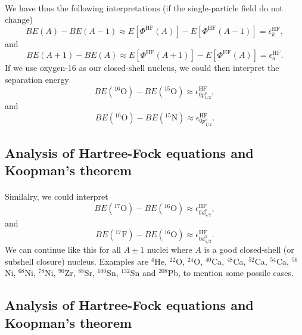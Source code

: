 \documentclass[%
twoside,                 %
final,                   %
10pt]{article}
\begin{document}
\paragraph{}
We have thus the following interpretations (if the single-particle field do not change)
\[
BE(A)-BE(A-1)\approx  E[\Phi^{\mathrm{HF}}(A)]-   E[\Phi^{\mathrm{HF}}(A-1)] 
  = \epsilon_k^{\mathrm{HF}}, 
\]
and
\[
BE(A+1)-BE(A)\approx  E[\Phi^{\mathrm{HF}}(A+1)]-   E[\Phi^{\mathrm{HF}}(A)] =  \epsilon_a^{\mathrm{HF}}. 
\]
If  we use oxygen-16 as our closed-shell nucleus, we could then interpret the separation energy
\[
BE(^{16}\mathrm{O})-BE(^{15}\mathrm{O})\approx \epsilon_{0p^{\nu}_{1/2}}^{\mathrm{HF}}, 
\]
and
\[
BE(^{16}\mathrm{O})-BE(^{15}\mathrm{N})\approx \epsilon_{0p^{\pi}_{1/2}}^{\mathrm{HF}}.
\]



\subsection*{Analysis of Hartree-Fock equations and Koopman's theorem}

\paragraph{}
Similalry, we could interpret
\[
BE(^{17}\mathrm{O})-BE(^{16}\mathrm{O})\approx \epsilon_{0d^{\nu}_{5/2}}^{\mathrm{HF}}, 
\]
and 
\[
BE(^{17}\mathrm{F})-BE(^{16}\mathrm{O})\approx\epsilon_{0d^{\pi}_{5/2}}^{\mathrm{HF}}.
\]
We can continue like this for all $A\pm 1$ nuclei where $A$ is a good closed-shell (or subshell closure)
nucleus. Examples are $^{4}$He, $^{22}$O, $^{24}$O, $^{40}$Ca, $^{48}$Ca, $^{52}$Ca, $^{54}$Ca, $^{56}$Ni, 
$^{68}$Ni, $^{78}$Ni, $^{90}$Zr, $^{88}$Sr, $^{100}$Sn, $^{132}$Sn and $^{208}$Pb, to mention some possile cases.



\subsection*{Analysis of Hartree-Fock equations and Koopman's theorem}

\end{document}
